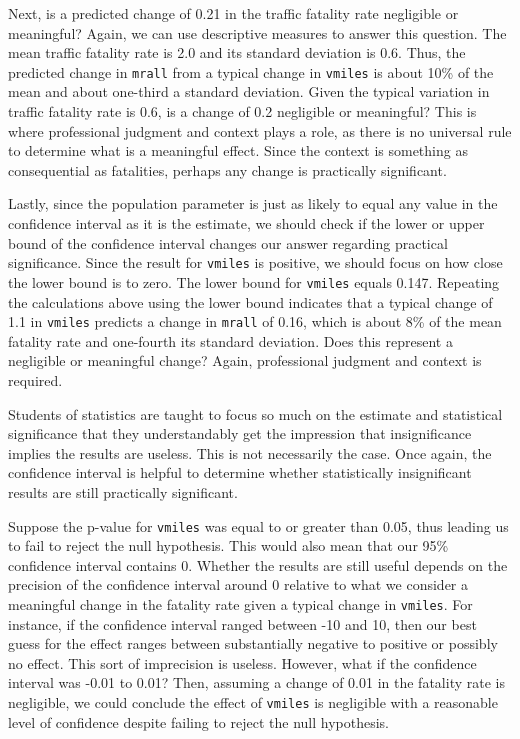 \documentclass[
]{book}
\begin{document}
Next, is a predicted change of 0.21 in the traffic fatality rate negligible or meaningful? Again, we can use descriptive measures to answer this question. The mean traffic fatality rate is 2.0 and its standard deviation is 0.6. Thus, the predicted change in \texttt{mrall} from a typical change in \texttt{vmiles} is about 10\% of the mean and about one-third a standard deviation. Given the typical variation in traffic fatality rate is 0.6, is a change of 0.2 negligible or meaningful? This is where professional judgment and context plays a role, as there is no universal rule to determine what is a meaningful effect. Since the context is something as consequential as fatalities, perhaps any change is practically significant.

Lastly, since the population parameter is just as likely to equal any value in the confidence interval as it is the estimate, we should check if the lower or upper bound of the confidence interval changes our answer regarding practical significance. Since the result for \texttt{vmiles} is positive, we should focus on how close the lower bound is to zero. The lower bound for \texttt{vmiles} equals 0.147. Repeating the calculations above using the lower bound indicates that a typical change of 1.1 in \texttt{vmiles} predicts a change in \texttt{mrall} of 0.16, which is about 8\% of the mean fatality rate and one-fourth its standard deviation. Does this represent a negligible or meaningful change? Again, professional judgment and context is required.

Students of statistics are taught to focus so much on the estimate and statistical significance that they understandably get the impression that insignificance implies the results are useless. This is not necessarily the case. Once again, the confidence interval is helpful to determine whether statistically insignificant results are still practically significant.

Suppose the p-value for \texttt{vmiles} was equal to or greater than 0.05, thus leading us to fail to reject the null hypothesis. This would also mean that our 95\% confidence interval contains 0. Whether the results are still useful depends on the precision of the confidence interval around 0 relative to what we consider a meaningful change in the fatality rate given a typical change in \texttt{vmiles}. For instance, if the confidence interval ranged between -10 and 10, then our best guess for the effect ranges between substantially negative to positive or possibly no effect. This sort of imprecision is useless. However, what if the confidence interval was -0.01 to 0.01? Then, assuming a change of 0.01 in the fatality rate is negligible, we could conclude the effect of \texttt{vmiles} is negligible with a reasonable level of confidence despite failing to reject the null hypothesis.
\end{document}
